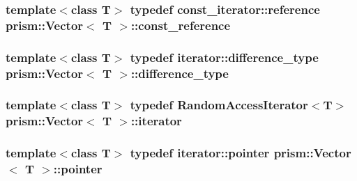 \subsubsection[{\texorpdfstring{const\+\_\+reference}{const_reference}}]{\setlength{\rightskip}{0pt plus 5cm}template$<$class T$>$ typedef {\bf const\+\_\+iterator\+::reference} {\bf prism\+::\+Vector}$<$ T $>$\+::{\bf const\+\_\+reference}}\hypertarget{classprism_1_1_vector_a75325487acaa0f63496c110e5a5632bb}{}\label{classprism_1_1_vector_a75325487acaa0f63496c110e5a5632bb}
\subsubsection[{\texorpdfstring{difference\+\_\+type}{difference_type}}]{\setlength{\rightskip}{0pt plus 5cm}template$<$class T$>$ typedef {\bf iterator\+::difference\+\_\+type} {\bf prism\+::\+Vector}$<$ T $>$\+::{\bf difference\+\_\+type}}\hypertarget{classprism_1_1_vector_a5fe3b74bfb30d75aa74d4d896e6b7227}{}\label{classprism_1_1_vector_a5fe3b74bfb30d75aa74d4d896e6b7227}
\subsubsection[{\texorpdfstring{iterator}{iterator}}]{\setlength{\rightskip}{0pt plus 5cm}template$<$class T$>$ typedef {\bf Random\+Access\+Iterator}$<$T$>$ {\bf prism\+::\+Vector}$<$ T $>$\+::{\bf iterator}}\hypertarget{classprism_1_1_vector_aa547779173a63f6f8c9b2887498d10eb}{}\label{classprism_1_1_vector_aa547779173a63f6f8c9b2887498d10eb}
\subsubsection[{\texorpdfstring{pointer}{pointer}}]{\setlength{\rightskip}{0pt plus 5cm}template$<$class T$>$ typedef {\bf iterator\+::pointer} {\bf prism\+::\+Vector}$<$ T $>$\+::{\bf pointer}}\hypertarget{classprism_1_1_vector_a9823d64f361cdff3fcc5043e8b4bd882}{}\label{classprism_1_1_vector_a9823d64f361cdff3fcc5043e8b4bd882}
